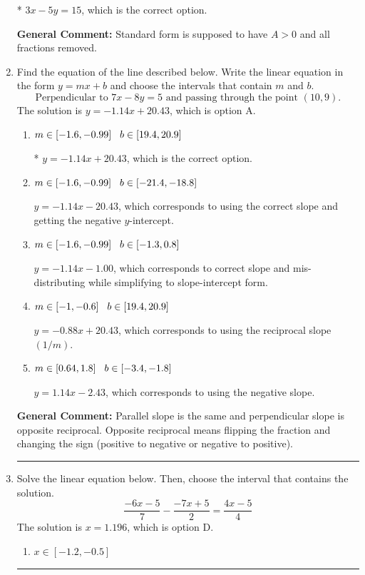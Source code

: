 \documentclass{extbook}[14pt]
\newcommand{\litem}[1]{\item #1

\rule{\textwidth}{0.4pt}}
\begin{document}
\begin{enumerate}
{\begin{enumerate}[label=\Alph*.]
* $3x - 5y = 15$, which is the correct option.
\end{enumerate}

\textbf{General Comment:} Standard form is supposed to have $A > 0$ and all fractions removed.
}
\litem{
Find the equation of the line described below. Write the linear equation in the form $ y=mx+b $ and choose the intervals that contain $m$ and $b$.
\[ \text{Perpendicular to } 7 x - 8 y = 5 \text{ and passing through the point } (10, 9). \]The solution is \( y = -1.14x + 20.43 \), which is option A.\begin{enumerate}[label=\Alph*.]
\item \( m \in [-1.6, -0.99] \hspace*{3mm} b \in [19.4, 20.9] \)

* $y = -1.14x + 20.43$, which is the correct option.
\item \( m \in [-1.6, -0.99] \hspace*{3mm} b \in [-21.4, -18.8] \)

 $y = -1.14x - 20.43$, which corresponds to using the correct slope and getting the negative $y$-intercept.
\item \( m \in [-1.6, -0.99] \hspace*{3mm} b \in [-1.3, 0.8] \)

 $y = -1.14x - 1.00$, which corresponds to correct slope and mis-distributing while simplifying to slope-intercept form.
\item \( m \in [-1, -0.6] \hspace*{3mm} b \in [19.4, 20.9] \)

 $y = -0.88x + 20.43$, which corresponds to using the reciprocal slope $(1/m)$.
\item \( m \in [0.64, 1.8] \hspace*{3mm} b \in [-3.4, -1.8] \)

 $y = 1.14x - 2.43$, which corresponds to using the negative slope.
\end{enumerate}

\textbf{General Comment:} Parallel slope is the same and perpendicular slope is opposite reciprocal. Opposite reciprocal means flipping the fraction and changing the sign (positive to negative or negative to positive).
}
\litem{
Solve the linear equation below. Then, choose the interval that contains the solution.
\[ \frac{-6x -5}{7} - \frac{-7x + 5}{2} = \frac{4x -5}{4} \]The solution is \( x = 1.196 \), which is option D.\begin{enumerate}[label=\Alph*.]
\item \( x \in [-1.2, -0.5] \)


\end{enumerate}}
\end{enumerate}
\end{document}
